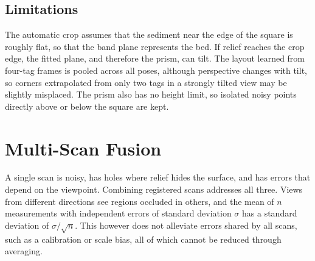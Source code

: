 \subsection{Limitations}
\label{subsec:Crop-Limitations}

The automatic crop assumes that the sediment near the edge of the square is roughly flat, so that the band plane represents the bed. If relief reaches the crop edge, the fitted plane, and therefore the prism, can tilt. The layout learned from four-tag frames is pooled across all poses, although perspective changes with tilt, so corners extrapolated from only two tags in a strongly tilted view may be slightly misplaced. The prism also has no height limit, so isolated noisy points directly above or below the square are kept.

\section{Multi-Scan Fusion}
\label{sec:fuse}
A single scan is noisy, has holes where relief hides the surface, and has errors that depend on the viewpoint. Combining registered scans addresses all three. Views from different directions see regions occluded in others, and the mean of $n$ measurements with independent errors of standard deviation $\sigma$ has a standard deviation of $\sigma/\sqrt{n}$. This however does not alleviate errors shared by all scans, such as a calibration or scale bias, all of which cannot be reduced through averaging.



